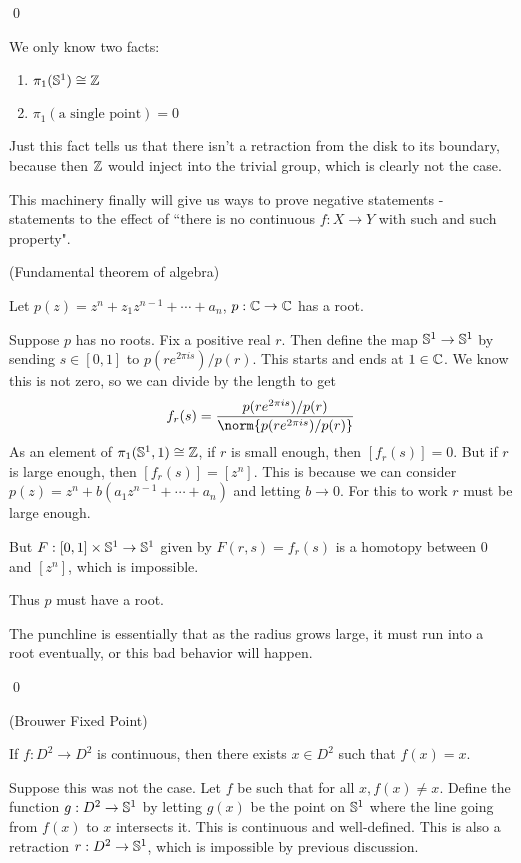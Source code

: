 \documentclass[x11names,reqno,14pt]{extarticle}
\begin{document}
\qed

We only know two facts:

\begin{enumerate}

\item $\pi_1(\mathbb{S}^1) \cong \mathbb{Z}$ 

\item $\pi_1(\text{a single point}) = 0$

\end{enumerate}

Just this fact tells us that there isn't a retraction from the disk to its boundary, because then $\mathbb{Z}$ would inject into the trivial group, which is clearly not the case. 

This machinery finally will give us ways to prove negative statements - statements to the effect of ``there is no continuous $f:X\to Y$ with such and such property".


\thm (Fundamental theorem of algebra)

Let $p(z) = z^n + z_1z^{n - 1} + \cdots + a_n$, $p:\mathbb{C}\to \mathbb{C}$ has a root. 

\proof

Suppose $p$ has no roots. Fix a positive real $r$. Then define the map $\mathbb{S}^1\to\mathbb{S}^1$ by sending $s \in [0, 1]$ to $p(re^{2\pi i s})/p(r)$. This starts and ends at $1 \in \mathbb{C}$. We know this is not zero, so we can divide by the length to get 
\[
f_r(s) = \frac{p(re^{2\pi i s})/p(r)}{\norm{p(re^{2\pi i s})/p(r)}}
\]
As an element of $\pi_1(\mathbb{S}^1, 1) \cong \mathbb{Z}$, if $r$ is small enough, then $[f_r(s)] = 0$. But if $r$ is large enough, then $[f_r(s)]= [z^n]$. This is because we can consider $p(z) = z^n + b(a_1z^{n - 1} + \cdots + a_n)$ and letting $b\to 0$. For this to work $r$ must be large enough.

But $F:[0,1]\times\mathbb{S}^1\to\mathbb{S}^1$ given by $F(r, s) = f_r(s)$ is a homotopy between $0$ and $[z^n]$, which is impossible. 

Thus $p$ must have a root. 

The punchline is essentially that as the radius grows large, it must run into a root eventually, or this bad behavior will happen.

\qed

\thm (Brouwer Fixed Point)

If $f:D^2\to D^2$ is continuous, then there exists $x \in D^2$ such that $f(x) = x$. 

\proof

Suppose this was not the case. Let $f$ be such that for all $x, f(x)\neq x$. Define the function $g:D^2\to\mathbb{S}^1$ by letting $g(x)$ be the point on $\mathbb{S}^1$ where the line going from $f(x)$ to $x$ intersects it. This is continuous and well-defined. This is also a retraction $r:D^2\to\mathbb{S}^1$, which is impossible by previous discussion. 
\end{document}
